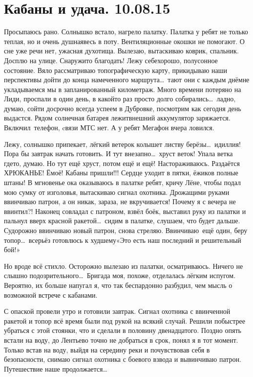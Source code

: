 \chapter{Кабаны и удача. 10.08.15}

Просыпаюсь рано. Солнышко встало, нагрело палатку. Палатка у ребят не только теплая, но и очень душная\mdash весь в поту. Вентиляционные окошки не помогают. О сне уже речи нет, ужасная духотища. Вылезаю, вытаскиваю коврик, спальник. Досплю на улице. Снаружи\sdash то благодать! Лежу себе\mdash хорошо, полусонное состояние. Вяло рассматриваю топографическую карту, прикидываю наши перспективы дойти до конца намеченного маршрута\ldots~тают они с каждым днём\mdash не укладываемся мы в запланированный километраж. Много времени потеряно на Лиди, проспали в один день, в какой\sdash то раз просто долго собирались\ldots~ладно, думаю, сойти досрочно всегда успеем в Дубровке, посмотрим как сегодня день выдастся. Рядом солнечная батарея лежит\mdash внешний аккумулятор заряжается. Включил~телефон, cвязи МТС нет. А у ребят Мегафон вчера ловился. 

Лежу, солнышко припекает, лёгкий ветерок колышет листву берёзы\ldots~идиллия! Пора бы завтрак начать готовить. И тут внезапно\ldots~хруст веток! Упала ветка где\sdash то, думаю. Но тут ещё хруст, потом ещё и ещё! Настораживаюсь. Раздаётся ХРЮКАНЬЕ! Ё\sdash моё! Кабаны пришли!!! Сердце уходит в пятки, ёжиков полные штаны! В мгновенье ока оказываюсь в палатке ребят, кричу Лёне, чтобы подал мою сумку от изголовья, вытаскиваю сигнал охотника. Дрожащими руками ввинчиваю патрон, а он никак, зараза, не вкручивается! Почему я с вечера не ввинтил?! Наконец совладал с патроном, взвёл боёк, выставил руку из палатки и пальнул вверх красной ракетой\ldots~сидим в палатке, слушаем, что будет дальше. Судорожно ввинчиваю новый патрон, снова стреляю. Ввинчиваю~ещё один, беру топор\ldots~всерьёз готовлюсь к худшему\mdash «Это есть наш последний и решительный бой!» 

Но вроде всё стихло. Осторожно вылезаю из палатки, осматриваюсь. Ничего не слышно подозрительного\ldots~Бригада моя, похоже, отделалась лёгким испугом. Вероятно, их больше напугал я, что так беспардонно разбудил, чем мысль о возможной встрече с кабанами.

С опаской провели утро и готовили завтрак. Сигнал охотника с ввинченной ракетой и топор всё время были под рукой на всякий случай. Решили побыстрее убраться с этой стоянки, что и сделали в половину двенадцатого. Поздно опять встали на воду, до Лентьево точно не добраться в срок, понял я в тот момент. Только встав на воду, выйдя на середину реки и почувствовав себя в безопасности, снимаю сигнал охотника с боевого взвода и вывинчиваю патрон. Путешествие наше продолжается\ldots~
 
